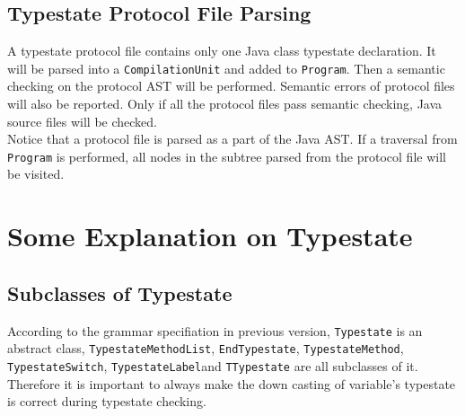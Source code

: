 \documentclass[]{article}
\begin{document}
\subsection{Typestate Protocol File Parsing}
A typestate protocol file contains only one Java class typestate declaration. It will be parsed into a \texttt{CompilationUnit} and added to \texttt{Program}. Then a semantic checking on the protocol AST will be performed. Semantic errors of protocol files will also be reported. Only if all the protocol files pass semantic checking, Java source files will be checked. \\[0.2cm]
Notice that a protocol file is parsed as a part of the Java AST. If a traversal from \texttt{Program} is performed, all nodes in the subtree parsed from the protocol file will be visited.

\section{Some Explanation on Typestate}
\subsection{Subclasses of Typestate}
According to the grammar specifiation in previous version, \texttt{Typestate} is an abstract class, \texttt{TypestateMethodList}, \texttt{EndTypestate}, \texttt{TypestateMethod}, \texttt{TypestateSwitch}, \texttt{TypestateLabel}and \texttt{TTypestate} are all subclasses of it. \\[0.2cm]
Therefore it is important to always make the down casting of variable's typestate is correct during typestate checking.
\end{document}
